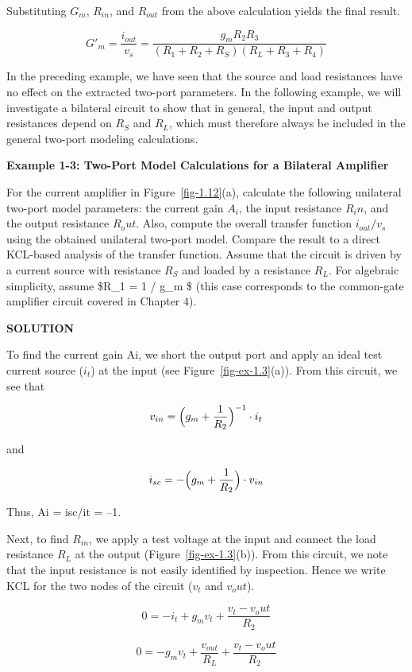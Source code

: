 \documentclass[
  11pt,
  letterpaper,
  abstract]{scrbook}
\begin{document}
Substituting \(G_m\), \(R_{in}\), and \(R_{out}\) from the above
calculation yields the final result.

\[
G'_m = \frac{i_{out}}{v_s} = \frac{g_m R_2 R_3}{(R_1 + R_2 + R_S)(R_L + R_3 + R_4)}
\]

In the preceding example, we have seen that the source and load
resistances have no effect on the extracted two-port parameters. In the
following example, we will investigate a bilateral circuit to show that
in general, the input and output resistances depend on \(R_S\) and
\(R_L\), which must therefore always be included in the general two-port
modeling calculations.

\textbf{Example 1-3: Two-Port Model Calculations for a Bilateral
Amplifier}

For the current amplifier in Figure~\ref{fig-1.12}(a), calculate the
following unilateral two-port model parameters: the current gain
\(A_i\), the input resistance \(R_in\), and the output resistance
\(R_out\). Also, compute the overall transfer function \(i_{out} / v_s\)
using the obtained unilateral two-port model. Compare the result to a
direct KCL-based analysis of the transfer function. Assume that the
circuit is driven by a current source with resistance \(R_S\) and loaded
by a resistance \(R_L\). For algebraic simplicity, assume \$R\_1 = 1 /
g\_m \$ (this case corresponds to the common-gate amplifier circuit
covered in Chapter 4).

\textbf{SOLUTION}

To find the current gain Ai, we short the output port and apply an ideal
test current source (\(i_t\)) at the input (see
Figure~\ref{fig-ex-1.3}(a)). From this circuit, we see that

\[
v_{in} = \Bigl( g_m + \frac{1}{R_2} \Bigr)^{-1} \cdot i_t
\]

and

\[
i_{sc} = - \Bigl( g_m + \frac{1}{R_2} \Bigr) \cdot v_{in}
\]

Thus, Ai = isc/it = --1.

Next, to find \(R_{in}\), we apply a test voltage at the input and
connect the load resistance \(R_L\) at the output
(Figure~\ref{fig-ex-1.3}(b)). From this circuit, we note that the input
resistance is not easily identified by inspection. Hence we write KCL
for the two nodes of the circuit (\(v_t\) and \(v_out\)).

\[
0 = -i_t + g_m v_t + \frac{v_t - v_out}{R_2}
\]

\[
0 = - g_m v_t + \frac{v_{out}}{R_L} + \frac{v_t - v_out}{R_2}
\]
\end{document}
